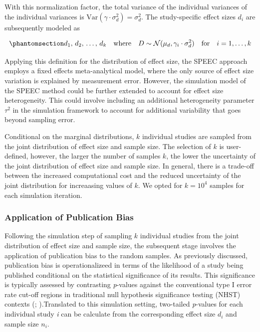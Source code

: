 \documentclass[
  12pt,
]{scrartcl}
\begin{document}
With this normalization factor, the total variance of the individual
variances of the individual variances is
\(\text{Var}(\gamma \cdot \sigma^2_d) = \sigma^2_d\). The study-specific
effect sizes \(d_i\) are subsequently modeled as

\begin{equation}\phantomsection\label{eq-norm-dist}{
d_1, \,d_2, \,\ldots, \,d_k \quad \text{where} \quad D \stackrel{}{\sim} \mathcal{N}(\mu_d, \gamma_i\cdot\sigma_d^2) \quad \text{for} \quad i = 1, \ldots, k 
}\end{equation}

Applying this definition for the distribution of effect size, the SPEEC
approach employs a fixed effects meta-analytical model, where the only
source of effect size variation is explained by measurement error.
However, the simulation model of the SPEEC method could be further
extended to account for effect size heterogeneity. This could involve
including an additional heterogeneity parameter \(\tau^2\) in the
simulation framework to account for additional variability that goes
beyond sampling error.

Conditional on the marginal distributions, \(k\) individual studies are
sampled from the joint distribution of effect size and sample size. The
selection of \(k\) is user-defined, however, the larger the number of
samples \(k\), the lower the uncertainty of the joint distribution of
effect size and sample size. In general, there is a trade-off between
the increased computational cost and the reduced uncertainty of the
joint distribution for increaasing values of \(k\). We opted for
\(k=10^4\) samples for each simulation iteration.

\subsubsection{Application of Publication
Bias}\label{application-of-publication-bias}

Following the simulation step of sampling \(k\) individual studies from
the joint distribution of effect size and sample size, the subsequent
stage involves the application of publication bias to the random
samples. As previously discussed, publication bias is operationalizeed
in terms of the likelihood of a study being published conditional on the
statistical significance of its results. This significance is typically
assessed by contrasting \emph{p}-values against the conventional type I
error rate cut-off regions in traditional null hypothesis significance
testing (NHST) contexts (;
).Translated to
this simulation setting, two-tailed \emph{p}-values for each individual
study \emph{i} can be calculate from the corresponding effect size
\(d_i\) and sample size \(n_i\).
\end{document}
